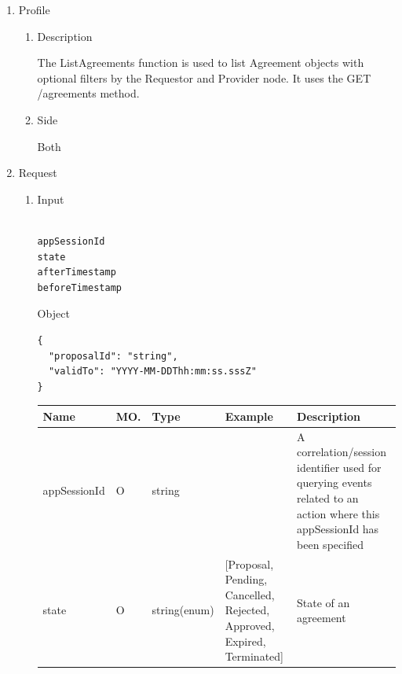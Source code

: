 \begin{enumerate}

\item Profile

\begin{enumerate}

\item Description

The ListAgreements function is used to list Agreement objects with optional filters by the Requestor and Provider node. 
It uses the GET /agreements method.

\item Side

Both

\end{enumerate}

\item Request

\begin{enumerate}

\item Input

\begin{tcolorbox}[boxrule=0pt, frame empty]
\begin{verbatim}

appSessionId
state
afterTimestamp
beforeTimestamp

\end{verbatim}
\end{tcolorbox}

Object
\begin{tcolorbox}[boxrule=0pt, frame empty]
\begin{verbatim}
{
  "proposalId": "string",
  "validTo": "YYYY-MM-DDThh:mm:ss.sssZ"
}
\end{verbatim}
\end{tcolorbox}

\begin{table}[H]
\footnotesize

\begin{center}
\begin{tabular}{|p{3cm}|l|p{3cm}|p{3cm}|p{4cm}|} 
\hline
\rowcolor{lightgray}	Name	& MO.	& Type	& Example & 	Description \\
\hline

appSessionId	& O & 	string				&			& A correlation/session identifier used for querying events related to an action where this appSessionId has been specified \\
\hline

state			& O	& 	string(enum)		&	[Proposal, Pending, Cancelled, Rejected, Approved, Expired, Terminated]	&	State of an agreement \\ 
\hline


\end{tabular}
\end{center}
\end{table}
\end{enumerate}
\end{enumerate}
